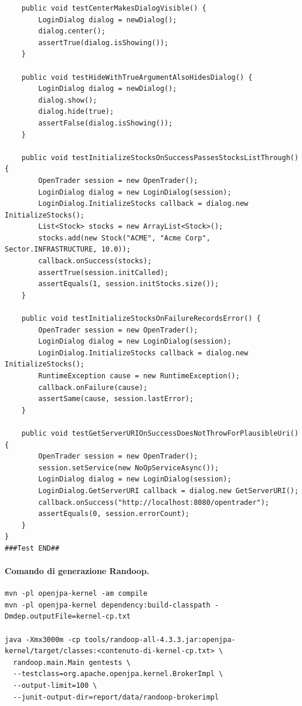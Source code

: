 \begin{lstlisting}
    public void testCenterMakesDialogVisible() {
        LoginDialog dialog = newDialog();
        dialog.center();
        assertTrue(dialog.isShowing());
    }

    public void testHideWithTrueArgumentAlsoHidesDialog() {
        LoginDialog dialog = newDialog();
        dialog.show();
        dialog.hide(true);
        assertFalse(dialog.isShowing());
    }

    public void testInitializeStocksOnSuccessPassesStocksListThrough() {
        OpenTrader session = new OpenTrader();
        LoginDialog dialog = new LoginDialog(session);
        LoginDialog.InitializeStocks callback = dialog.new InitializeStocks();
        List<Stock> stocks = new ArrayList<Stock>();
        stocks.add(new Stock("ACME", "Acme Corp", Sector.INFRASTRUCTURE, 10.0));
        callback.onSuccess(stocks);
        assertTrue(session.initCalled);
        assertEquals(1, session.initStocks.size());
    }

    public void testInitializeStocksOnFailureRecordsError() {
        OpenTrader session = new OpenTrader();
        LoginDialog dialog = new LoginDialog(session);
        LoginDialog.InitializeStocks callback = dialog.new InitializeStocks();
        RuntimeException cause = new RuntimeException();
        callback.onFailure(cause);
        assertSame(cause, session.lastError);
    }

    public void testGetServerURIOnSuccessDoesNotThrowForPlausibleUri() {
        OpenTrader session = new OpenTrader();
        session.setService(new NoOpServiceAsync());
        LoginDialog dialog = new LoginDialog(session);
        LoginDialog.GetServerURI callback = dialog.new GetServerURI();
        callback.onSuccess("http://localhost:8080/opentrader");
        assertEquals(0, session.errorCount);
    }
}
###Test END##
\end{lstlisting}

\paragraph*{Comando di generazione Randoop.}
\label{cmd:randoop-brokerimpl}
\begin{lstlisting}
mvn -pl openjpa-kernel -am compile
mvn -pl openjpa-kernel dependency:build-classpath -Dmdep.outputFile=kernel-cp.txt

java -Xmx3000m -cp tools/randoop-all-4.3.3.jar:openjpa-kernel/target/classes:<contenuto-di-kernel-cp.txt> \
  randoop.main.Main gentests \
  --testclass=org.apache.openjpa.kernel.BrokerImpl \
  --output-limit=100 \
  --junit-output-dir=report/data/randoop-brokerimpl
\end{lstlisting}


